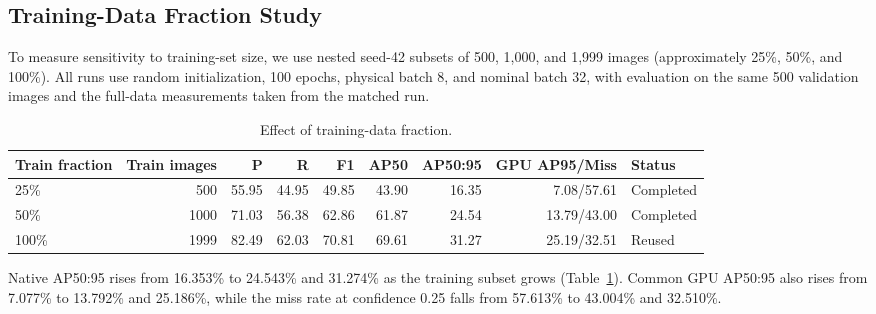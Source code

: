 \documentclass[lettersize,journal]{IEEEtran}
\begin{document}
\subsection{Training-Data Fraction Study}
To measure sensitivity to training-set size, we use nested seed-42 subsets of 500, 1,000, and 1,999 images (approximately 25\%, 50\%, and 100\%). All runs use random initialization, 100 epochs, physical batch 8, and nominal batch 32, with evaluation on the same 500 validation images and the full-data measurements taken from the matched run.
\begin{table}[!t]
\caption{Effect of training-data fraction.}
\label{tab:ratio}
\centering\footnotesize
\setlength{\tabcolsep}{3pt}
\begin{tabular}{lrrrrrrrl}
\hline
Train fraction & Train images & P & R & F1 & AP50 & AP50:95 & GPU AP95/Miss & Status\\
\hline
25\% & 500 & 55.95 & 44.95 & 49.85 & 43.90 & 16.35 & 7.08/57.61 & Completed\\
50\% & 1000 & 71.03 & 56.38 & 62.86 & 61.87 & 24.54 & 13.79/43.00 & Completed\\
100\% & 1999 & 82.49 & 62.03 & 70.81 & 69.61 & 31.27 & 25.19/32.51 & Reused\\
\hline
\end{tabular}
\end{table}

Native AP50:95 rises from 16.353\% to 24.543\% and 31.274\% as the training subset grows (Table~\ref{tab:ratio}). Common GPU AP50:95 also rises from 7.077\% to 13.792\% and 25.186\%, while the miss rate at confidence 0.25 falls from 57.613\% to 43.004\% and 32.510\%.
\end{document}
